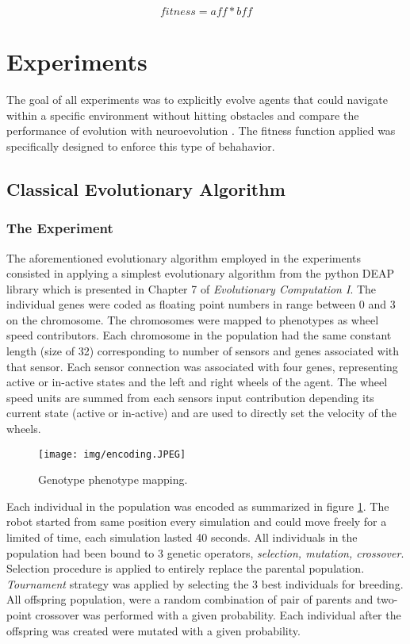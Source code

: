 \documentclass[format=acmsmall, review=false, screen=true]{acmart}
\begin{document}
\[ fitness = aff * bff \]

\section{Experiments}

The goal of all experiments was to explicitly evolve agents that could navigate within a specific environment without hitting obstacles and compare the performance of evolution with neuroevolution . The fitness function applied was specifically designed to enforce this type of behahavior.

\subsection{Classical Evolutionary Algorithm}

\subsubsection{The Experiment}

The aforementioned evolutionary algorithm employed in the experiments consisted in applying a simplest evolutionary algorithm from the python DEAP library which is presented in Chapter 7 of \emph{Evolutionary Computation I}\cite{back2000evolutionary}. The individual genes were coded as floating point numbers in range between 0 and 3 on the chromosome. The chromosomes were mapped to phenotypes as wheel speed contributors. Each chromosome in the population had the same constant length (size of 32) corresponding to number of sensors and genes associated with that sensor. Each sensor connection was associated with four genes, representing active or in-active states and the left and right wheels of the agent. The wheel speed units are summed from each sensors input contribution depending its current state (active or in-active) and are used to directly set the velocity of the wheels.

\begin{figure}[H]
  \texttt{[image: img/encoding.JPEG]}
  \caption{Genotype phenotype mapping.}
  \label{fig:encoding}
\end{figure}

Each individual in the population was encoded as summarized in figure \ref{fig:encoding}. The robot started from same position every simulation and could move freely for a limited of time, each simulation lasted 40 seconds. All individuals in the population had been bound to 3 genetic operators, \emph{selection, mutation, crossover}. Selection procedure is applied to entirely replace the parental population. \emph{Tournament} strategy was applied by selecting the 3 best individuals for breeding. All offspring population, were a random combination of pair of parents and two-point crossover was performed with a given probability. Each individual after the offspring was created were mutated with a given probability.
\end{document}
